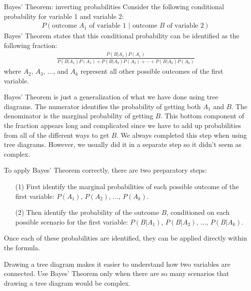\begin{onebox}{Bayes' Theorem: inverting probabilities}
Consider the following conditional probability for variable 1 and variable 2:\vspace{-1.5mm}
\begin{align*}
P(\text{outcome $A_1$ of variable 1 } | \text{ outcome $B$ of variable 2})
\end{align*}
Bayes' Theorem states that this conditional probability can be identified as the following fraction:\vspace{-1.5mm}
\begin{align*}
\frac{P(B | A_1) P(A_1)}
	{P(B | A_1) P(A_1) + P(B | A_2) P(A_2) + \cdots + P(B | A_k) P(A_k)}
\end{align*}
where $A_2$, $A_3$, ..., and $A_k$ represent all other possible outcomes of the first variable.
\end{onebox}

Bayes' Theorem is just a generalization of what we have done using tree diagrams. The numerator identifies the probability of getting both $A_1$ and $B$. The denominator is the marginal probability of getting $B$. This bottom component of the fraction appears long and complicated since we have to add up probabilities from all of the different ways to get $B$. We always completed this step when using tree diagrams. However, we usually did it in a separate step so it didn't seem as complex.

To apply Bayes' Theorem correctly, there are two preparatory steps:
\begin{enumerate}
\setlength{\itemsep}{0mm}
\item[(1)] First identify the marginal probabilities of each possible outcome of the first variable: $P(A_1)$, $P(A_2)$, ..., $P(A_k)$.
\item[(2)] Then identify the probability of the outcome $B$, conditioned on each possible scenario for the first variable: $P(B | A_1)$, $P(B | A_2)$, ..., $P(B | A_k)$.
\end{enumerate}
Once each of these probabilities are identified, they can be applied directly within the formula.

\begin{tipBox}{
Drawing a tree diagram makes it easier to understand how two variables are connected. Use Bayes' Theorem only when there are so many scenarios that drawing a tree diagram would be complex.}
\end{tipBox}

